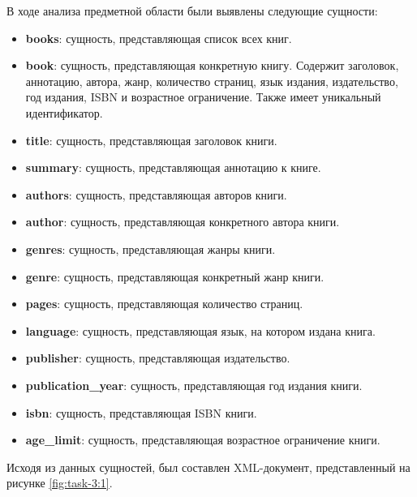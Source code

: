 \documentclass[a4paper, 14pt]{extarticle}
\begin{document}
В ходе анализа предметной области были выявлены следующие сущности:
\begin{itemize}
  \item \textbf{books}: сущность, представляющая список всех книг.
  \item \textbf{book}: сущность, представляющая конкретную книгу. Содержит
  заголовок, аннотацию, автора, жанр, количество страниц, язык издания,
  издательство, год издания, ISBN и возрастное ограничение. Также имеет
  уникальный идентификатор.
  \item \textbf{title}: сущность, представляющая заголовок книги.
  \item \textbf{summary}: сущность, представляющая аннотацию к книге.
  \item \textbf{authors}: сущность, представляющая авторов книги.
  \item \textbf{author}: сущность, представляющая конкретного автора книги.
  \item \textbf{genres}: сущность, представляющая жанры книги.
  \item \textbf{genre}: сущность, представляющая конкретный жанр книги.
  \item \textbf{pages}: сущность, представляющая количество страниц.
  \item \textbf{language}: сущность, представляющая язык, на котором издана
  книга.
  \item \textbf{publisher}: сущность, представляющая издательство.
  \item \textbf{publication\_year}: сущность, представляющая год издания книги.
  \item \textbf{isbn}: сущность, представляющая ISBN книги.
  \item \textbf{age\_limit}: сущность, представляющая возрастное ограничение
  книги.
\end{itemize}

Исходя из данных сущностей, был составлен XML-документ, представленный на
рисунке \ref{fig:task-3:1}.
\end{document}
